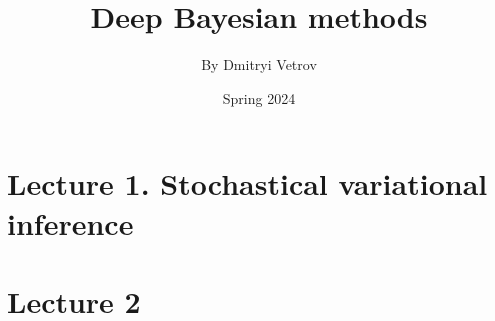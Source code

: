 

\usepackage{fancyhdr}
\pagestyle{fancy} 
    \fancyhead{} 

\title{Deep Bayesian methods}
\author{By Dmitryi Vetrov} 
\date{Spring 2024}

  

\maketitle

\tableofcontents

\newpage

\section{Lecture 1. Stochastical variational inference}



\section{Lecture 2}





